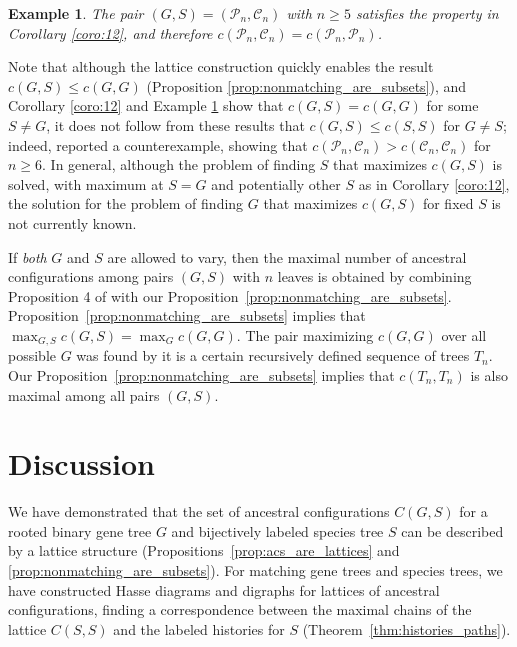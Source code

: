 \documentclass[10pt]{article}
\newtheorem{example}[theorem]{Example}
\begin{document}
\begin{example}
	The pair $(G,S) = (\mathcal P_n, \mathcal C_n)$ with $n\geq 5$ satisfies the property in Corollary \ref{coro:12}, and therefore $c(\mathcal P_n, \mathcal C_n) = c(\mathcal P_n, \mathcal P_n)$. 
	\label{examp:13}
\end{example}

Note that although the lattice construction quickly enables the result $c(G,S) \leq c(G,G)$ (Proposition \ref{prop:nonmatching_are_subsets}), and Corollary \ref{coro:12} and Example \ref{examp:13} show that $c(G,S)=c(G,G)$ for some $S \neq G$, it does not follow from these results that $c(G,S) \leq c(S,S)$ for $G \neq S$; indeed, \cite{disanto2017enumeration} reported a counterexample, showing that $c(\mathcal P_n,\mathcal C_n) > c(\mathcal C_n, \mathcal C_n)$ for $n \geq 6$. In general, although the problem of finding $S$ that maximizes $c(G,S)$ is solved, with maximum at $S=G$ and potentially other $S$ as in Corollary \ref{coro:12}, the solution for the problem of finding $G$ that maximizes $c(G,S)$ for fixed $S$ is not currently known.

If \emph{both} $G$ and $S$ are allowed to vary, then the maximal number of ancestral configurations among pairs $(G,S)$ with $n$ leaves is obtained by combining Proposition 4 of \cite{disanto2017enumeration} with our Proposition~\ref{prop:nonmatching_are_subsets}. 
Proposition~\ref{prop:nonmatching_are_subsets} implies that $\max_{G,S} c(G,S) = \max_{G} c(G,G)$. The pair maximizing $c(G,G)$ over all possible $G$ was found by \cite{disanto2017enumeration} it is a certain recursively defined sequence of trees $T_n$. Our Proposition~\ref{prop:nonmatching_are_subsets} implies that $c(T_n,T_n)$ is also maximal among all pairs $(G,S)$.

\section{Discussion}
\label{sec:discussion}

We have demonstrated that the set of ancestral configurations $C(G,S)$ for a rooted binary gene tree $G$ and bijectively labeled species tree $S$ can be described by a lattice structure (Propositions~\ref{prop:acs_are_lattices} and \ref{prop:nonmatching_are_subsets}). For matching gene trees and species trees, we have constructed Hasse diagrams and  digraphs for lattices of ancestral configurations, finding a correspondence between the maximal chains of the lattice $C(S,S)$ and the labeled histories for $S$ (Theorem~\ref{thm:histories_paths}).
\end{document}
